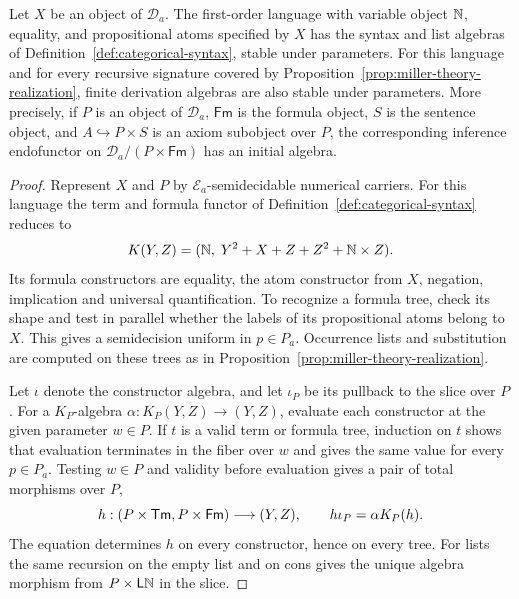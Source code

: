 \begin{lemma}\label{lem:miller-parameterized-deduction}
Let $X$ be an object of $\mathcal D_a$. The first-order language
with variable object $\mathbb N$, equality, and propositional atoms specified
by $X$ has the syntax and list algebras of
Definition~\ref{def:categorical-syntax}, stable under parameters.
For this language and for every recursive signature covered by
Proposition~\ref{prop:miller-theory-realization}, finite derivation
algebras are also stable under parameters. More precisely, if $P$
is an object of $\mathcal D_a$, $\mathsf{Fm}$ is the formula object,
$S$ is the sentence object, and
$A\hookrightarrow P\times S$ is an axiom subobject over $P$, the
corresponding inference endofunctor on
$\mathcal D_a/(P\times\mathsf{Fm})$ has an initial algebra.
\end{lemma}
\begin{proof}
Represent $X$ and $P$ by $\mathcal E_a$-semidecidable numerical
carriers. For this language the term and formula functor of
Definition~\ref{def:categorical-syntax} reduces to
\[
 K(Y,Z)=(\mathbb N,\;Y^2+X+Z+Z^2+\mathbb N\times Z).
\]
Its formula constructors are equality, the atom constructor from $X$,
negation, implication and universal quantification. To recognize a
formula tree, check its shape and test in parallel whether the labels
of its propositional atoms belong to $X$. This gives a semidecision
uniform in $p\in P_a$. Occurrence lists and substitution are computed
on these trees as in Proposition~\ref{prop:miller-theory-realization}.

Let $\iota$ denote the constructor algebra, and let $\iota_P$ be its
pullback to the slice over $P$. For a $K_P$-algebra
$\alpha:K_P(Y,Z)\to(Y,Z)$, evaluate each constructor at the given
parameter $w\in P$. If $t$ is a valid term or formula tree, induction
on $t$ shows that evaluation terminates in the fiber over $w$ and gives
the same value for every $p\in P_a$. Testing $w\in P$ and validity
before evaluation gives a pair of total morphisms over $P$,
\[
 h:(P\times\mathsf{Tm},P\times\mathsf{Fm})\longrightarrow(Y,Z),
 \qquad h\iota_P=\alpha K_P(h).
\]
The equation determines $h$ on every constructor, hence on every tree.
For lists the same recursion on the empty list and on cons gives the
unique algebra morphism from $P\times\mathsf L\mathbb N$ in the slice.


\end{proof}
